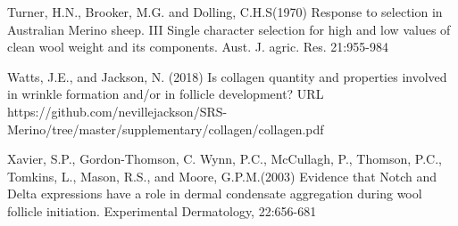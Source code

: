 \documentclass[titlepage]{article}  %
\begin{document}
\begin{thebibliography}{99}
Turner, H.N., Brooker, M.G. and Dolling, C.H.S(1970) Response to selection in Australian Merino sheep. III Single character selection for high and low values of clean wool weight and its components. Aust. J. agric. Res. 21:955-984

Watts, J.E., and Jackson, N. (2018) Is collagen quantity and properties involved in wrinkle formation and/or in follicle development? URL https://github.com/nevillejackson/SRS-Merino/tree/master/supplementary/collagen/collagen.pdf

Xavier, S.P., Gordon-Thomson, C. Wynn, P.C., McCullagh, P., Thomson, P.C., Tomkins, L., Mason, R.S., and Moore, G.P.M.(2003) Evidence that Notch and Delta expressions have a role in dermal condensate aggregation during wool follicle initiation. Experimental Dermatology, 22:656-681

\end{thebibliography}

\appendix
\end{document}
